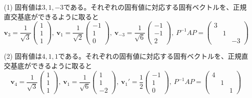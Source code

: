 \noindent (1) 固有値は$3, 1, -3$である。それぞれの固有値に対応する固有ベクトルを、正規直交基底ができるように取ると
\[
\bm{v}_{3} =
\frac{1}{\sqrt{3}}
\begin{pmatrix}
1 \\
1 \\
1
\end{pmatrix}, \ 
\bm{v}_{1} =
\frac{1}{\sqrt{2}}
\begin{pmatrix}
-1 \\
1 \\
0
\end{pmatrix}, \ 
\bm{v}_{-3} =
\frac{1}{\sqrt{6}}
\begin{pmatrix}
-1 \\
-1 \\
2
\end{pmatrix}, \ 
P^{-1} A P 
= 
\begin{pmatrix}
3 \\
& 1 \\
& & -3
\end{pmatrix}
\]

\noindent (2) 固有値は$4, 1, 1$である。それぞれの固有値に対応する固有ベクトルを、正規直交基底ができるように取ると %
\[
\bm{v}_{4} =
\frac{1}{\sqrt{3}}
\begin{pmatrix}
1 \\
1 \\
1
\end{pmatrix}, \ 
\bm{v}_{1} =
\frac{1}{\sqrt{6}}
\begin{pmatrix}
1 \\
1 \\
-2
\end{pmatrix}, \ 
\bm{v}_{1}' =
\frac{1}{2}
\begin{pmatrix}
-1 \\
1 \\
0
\end{pmatrix}, \ 
P^{-1} A P 
= 
\begin{pmatrix}
4 \\
& 1 \\
& & 1
\end{pmatrix}
\]

